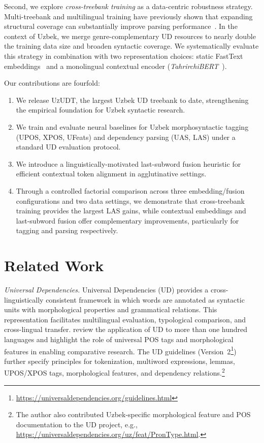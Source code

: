 \documentclass[runningheads]{llncs}
\begin{document}
Second, we explore \emph{cross-treebank training} as a data-centric
robustness strategy.
Multi-treebank and multilingual training have previously shown
that expanding structural coverage can substantially improve parsing
performance~\cite{1602.01925,zeman-etal-2018-conll}.
In the context of Uzbek, we merge genre-complementary UD resources to
nearly double the training data size and broaden syntactic coverage.
We systematically evaluate this strategy in combination with two
representation choices: static FastText
embeddings~\cite{bojanowski-etal-2017-enriching} and a monolingual
contextual encoder
(\textit{TahrirchiBERT}~\cite{Mamasaidov2023TahrirchiBERT}).

Our contributions are fourfold:
\begin{enumerate}
    \item We release \textsc{UzUDT}, the largest Uzbek UD treebank to
      date, strengthening the empirical foundation for Uzbek syntactic
      research.
    \item We train and evaluate neural baselines for Uzbek
      morphosyntactic tagging (UPOS, XPOS, UFeats) and dependency
      parsing (UAS, LAS) under a standard UD evaluation protocol.
    \item We introduce a linguistically-motivated last-subword fusion
      heuristic for efficient contextual token alignment in
      agglutinative settings.
    \item Through a controlled factorial comparison across three
      embedding\slash fusion configurations and two data settings, we
      demonstrate that cross-treebank training provides the largest
      LAS gains, while contextual embeddings and last-subword fusion
      offer complementary improvements, particularly for tagging and
      parsing respectively.
\end{enumerate}
\section{Related Work}

\noindent\textit{Universal Dependencies.}
Universal Dependencies (UD) provides a cross-linguistically consistent framework in which words are annotated as syntactic units with morphological properties and grammatical relations. This representation facilitates multilingual evaluation, typological comparison, and cross-lingual transfer. \cite{de-marneffe-etal-2021-universal} review the application of UD to more than one hundred languages and highlight the role of universal POS tags and morphological features in enabling comparative research. The UD guidelines (Version~2\footnote{\url{https://universaldependencies.org/guidelines.html}}) further specify principles for tokenization, multiword expressions, lemmas, UPOS/XPOS tags, morphological features, and dependency relations.\footnote{The author also contributed Uzbek-specific morphological feature and POS documentation to the UD project, e.g., \url{https://universaldependencies.org/uz/feat/PronType.html}.}
\end{document}
